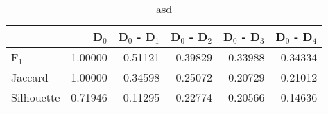 \begin{table}
\centering
\caption{asd}
\label{tab:s1-cont-total-splitmerge-single}
\begin{tabular}{lrrrrr}
\toprule
{} &   D$_0$ &  D$_0$ - D$_1$ &  D$_0$ - D$_2$ &  D$_0$ - D$_3$ &  D$_0$ - D$_4$ \\
\midrule
F$_1$      & 1.00000 &        0.51121 &        0.39829 &        0.33988 &        0.34334 \\
Jaccard    & 1.00000 &        0.34598 &        0.25072 &        0.20729 &        0.21012 \\
Silhouette & 0.71946 &       -0.11295 &       -0.22774 &       -0.20566 &       -0.14636 \\
\bottomrule
\end{tabular}
\end{table}
